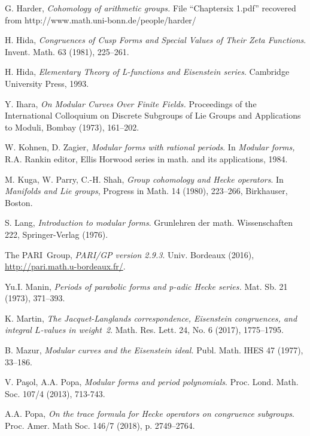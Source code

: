\documentclass{amsart}
\theoremstyle{plain}
\theoremstyle{definition}
\numberwithin{equation}{section}
\begin{document}
\begin{thebibliography}{99}
 G. Harder, \emph{Cohomology of arithmetic groups.} File 
``Chaptersix 1.pdf'' recovered from http://www.math.uni-bonn.de/people/harder/

 H. Hida, \emph{Congruences of Cusp Forms and Special Values 
of Their Zeta Functions}. Invent. Math. 63 (1981), 225--261. 

 H. Hida, \emph{Elementary Theory of L-functions and Eisenstein 
series}. Cambridge University Press, 1993.

 Y. Ihara, \emph{On Modular Curves Over Finite Fields.} 
Proceedings of the International Colloquium on Discrete Subgroups of Lie Groups 
and Applications to Moduli, Bombay (1973), 161--202.

 W. Kohnen, D. Zagier, \emph{Modular forms with rational
periods}. In \emph{Modular forms,} R.A. Rankin editor, Ellis Horwood series in
math. and its applications, 1984.

 M. Kuga, W. Parry, C.-H. Shah, \emph{Group cohomology and 
Hecke operators}. In \emph{Manifolds and Lie groups}, Progress in Math. 14 (1980), 
223--266, Birkhauser, Boston.

 S. Lang, \emph{Introduction to modular forms}. Grunlehren 
der math. Wissenschaften 222, Springer-Verlag (1976).

    The PARI~Group, \emph{PARI/GP version 2.9.3}. Univ. Bordeaux (2016),
    \url{http://pari.math.u-bordeaux.fr/}.
    
 Yu.I. Manin,  \emph{Periods of parabolic forms 
and p-adic Hecke series.} Mat. Sb. 21 (1973), 371--393.


 K. Martin, \emph{The Jacquet-Langlands correspondence, Eisenstein
congruences, and integral $L$-values in weight~2}. Math. Res. 
Lett. 24, No. 6 (2017), 1775--1795.

 B. Mazur, \emph{Modular curves and the Eisenstein ideal.} Publ. Math. IHES 47 (1977), 33--186.

  V. Pa\c{s}ol, A.A. Popa, \emph{Modular forms and period polynomials}.
Proc. Lond. Math. Soc. 107/4 (2013), 713-743.

 A.A.  Popa, \emph{On the trace formula for Hecke operators on congruence subgroups}.
Proc. Amer. Math Soc. 146/7 (2018), p. 2749--2764.


\end{thebibliography}
\end{document}
